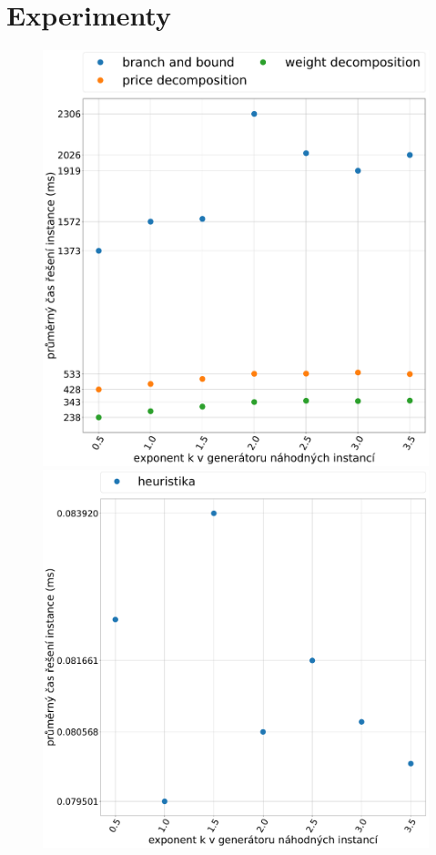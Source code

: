 \documentclass[11pt]{article}
\begin{document}
\section{Experimenty}
 
 
\begin{figure}
	\centering
    \begin{minipage}[c]{0.49\textwidth}
        \centering\includegraphics[width=\textwidth]{img/GVE.pdf} 
    \end{minipage}
    \begin{minipage}[c]{0.49\textwidth}
        \centering \includegraphics[width=\textwidth]{img/GVH.pdf} 

\end{minipage}
\end{figure}
\end{document}
